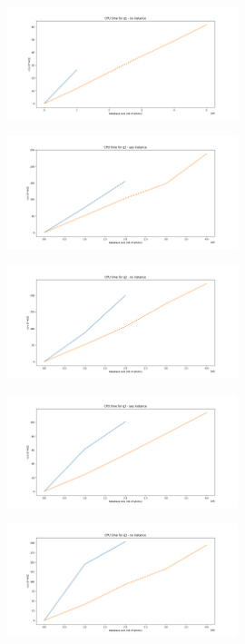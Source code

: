 \documentclass[acmsmall]{acmart}
\begin{document}
\begin{CCSXML}
\begin{figure}[H]
\includegraphics[width=0.6\textwidth]{time_q1_noinstance.png}
\centering
\end{figure}

\begin{figure}[H]
\includegraphics[width=0.6\textwidth]{time_q2_yesinstance.png}
\centering
\end{figure}

\begin{figure}[H]
\includegraphics[width=0.6\textwidth]{time_q2_noinstance.png}
\centering
\end{figure}

\begin{figure}[H]
\includegraphics[width=0.6\textwidth]{time_q3_yesinstance.png}
\centering
\end{figure}

\begin{figure}[H]
\includegraphics[width=0.6\textwidth]{time_q3_noinstance.png}
\centering
\end{figure}


\end{CCSXML}
\end{document}
